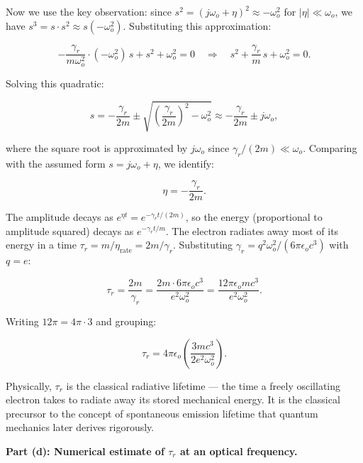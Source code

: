 Now we use the key observation: since $s^2 = (j\omega_o + \eta)^2 \approx -\omega_o^2$ for $|\eta| \ll \omega_o$, we have $s^3 = s \cdot s^2 \approx s(-\omega_o^2)$. Substituting this approximation:

\begin{equation*}
  -\frac{\gamma_r}{m\omega_o^2}\cdot(-\omega_o^2)\,s + s^2 + \omega_o^2 = 0
  \quad\Longrightarrow\quad
  s^2 + \frac{\gamma_r}{m}\,s + \omega_o^2 = 0.
\end{equation*}

Solving this quadratic:

\begin{equation*}
  s = -\frac{\gamma_r}{2m} \pm \sqrt{\left(\frac{\gamma_r}{2m}\right)^{\!2} - \omega_o^2}
  \approx -\frac{\gamma_r}{2m} \pm j\omega_o,
\end{equation*}

where the square root is approximated by $j\omega_o$ since $\gamma_r/(2m) \ll \omega_o$. Comparing with the assumed form $s = j\omega_o + \eta$, we identify:

\begin{equation*}
  \eta = -\frac{\gamma_r}{2m}.
\end{equation*}

The amplitude decays as $e^{\eta t} = e^{-\gamma_r t/(2m)}$, so the energy (proportional to amplitude squared) decays as $e^{-\gamma_r t/m}$. The electron radiates away most of its energy in a time $\tau_r = m/\eta_{\text{rate}} = 2m/\gamma_r$. Substituting $\gamma_r = q^2\omega_o^2/(6\pi\epsilon_o c^3)$ with $q = e$:

\begin{equation*}
  \tau_r = \frac{2m}{\gamma_r} = \frac{2m \cdot 6\pi\epsilon_o c^3}{e^2\omega_o^2}
  = \frac{12\pi\epsilon_o m c^3}{e^2\omega_o^2}.
\end{equation*}

Writing $12\pi = 4\pi \cdot 3$ and grouping:

\begin{equation*}
  \boxed{\tau_r = 4\pi\epsilon_o\!\left(\frac{3mc^3}{2e^2\omega_o^2}\right).}
\end{equation*}

Physically, $\tau_r$ is the classical radiative lifetime — the time a freely oscillating electron takes to radiate away its stored mechanical energy. It is the classical precursor to the concept of spontaneous emission lifetime that quantum mechanics later derives rigorously.

\textbf{Part (d): Numerical estimate of $\tau_r$ at an optical frequency.}

